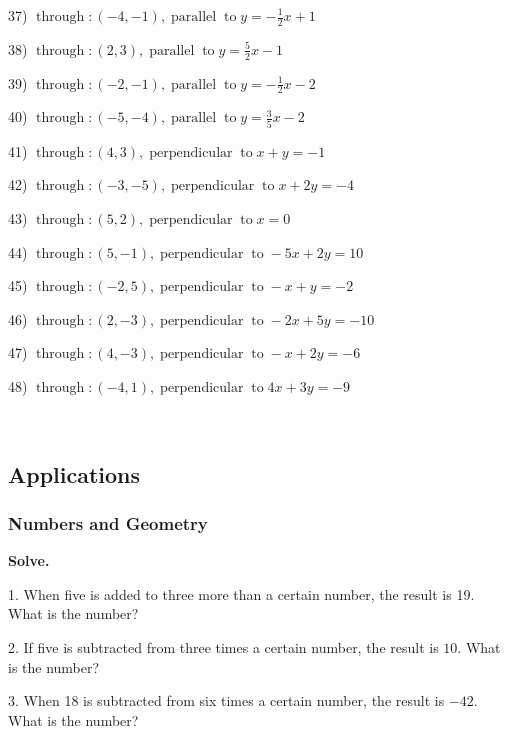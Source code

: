 \documentclass[11pt]{book}
\newcommand{\tmop}[1]{\ensuremath{\operatorname{#1}}}
\newcommand{\tmstrong}[1]{\textbf{#1}}
\theoremstyle{definition}  %
\begin{document}
37) $\tmop{through} : (- 4, - 1), \tmop{parallel} \tmop{to} y = - \frac{1}{2}
x + 1$

38) $\tmop{through} : (2, 3), \tmop{parallel} \tmop{to} y = \frac{5}{2} x - 1$

39) $\tmop{through} : (- 2, - 1), \tmop{parallel} \tmop{to} y = - \frac{1}{2}
x - 2$

40) $\tmop{through} : (- 5, - 4), \tmop{parallel} \tmop{to} y = \frac{3}{5} x
- 2$

41) $\tmop{through} : (4, 3), \tmop{perpendicular} \tmop{to} x + y = - 1$

42) $\tmop{through} : (- 3, - 5), \tmop{perpendicular} \tmop{to} x + 2 y = -
4$

43) $\tmop{through} : (5, 2), \tmop{perpendicular} \tmop{to} x = 0$

44) $\tmop{through} : (5, - 1), \tmop{perpendicular} \tmop{to} - 5 x + 2 y =
10$

45) $\tmop{through} : (- 2, 5), \tmop{perpendicular} \tmop{to} - x + y = - 2$

46) $\tmop{through} : (2, - 3), \tmop{perpendicular} \tmop{to} - 2 x + 5 y = -
10$

47) $\tmop{through} : (4, - 3), \tmop{perpendicular} \tmop{to} - x + 2 y = -
6$

48) $\tmop{through} : (- 4, 1), \tmop{perpendicular} \tmop{to} 4 x + 3 y = -
9$

\vspace{3in}
~

\pagebreak

\subsection{Applications}\par

	\subsubsection{Numbers and Geometry}\par

{\tmstrong{Solve.}}

1. When five is added to three more than a certain number, the result is 19.  What is the number?

2. If five is subtracted from three times a certain number, the result is
$10$. What is the number?

3. When 18 is subtracted from six times a certain number, the result is $-
42$. What is the number?
\end{document}
